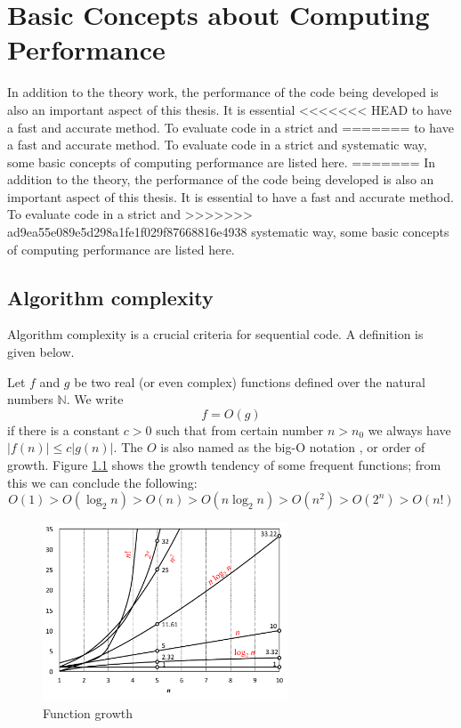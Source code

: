 
\chapter{Basic Concepts about Computing Performance\label{chpt:computing-performance}}

In addition to the theory work, the performance of the code being
developed is also an important aspect of this thesis. It is essential
<<<<<<< HEAD
to have a fast and accurate method. To evaluate code in a strict and
=======
to have a fast and accurate method. To evaluate code in a strict
and systematic way, some basic concepts of computing performance are
listed here. 
=======
In addition to the theory, the performance of the code being developed is
also an important aspect of this thesis. It is essential to
have a fast and accurate method. To evaluate code in a strict and
>>>>>>> ad9ea55e089e5d298a1fe1f029f87668816e4938
systematic way, some basic concepts of computing performance are listed
here. 


\section{Algorithm complexity}

Algorithm complexity is a crucial criteria for sequential code. A
definition is given below.

Let $f$ and $g$ be two real (or even complex) functions defined
over the natural numbers $\mathbb{N}$. We write
\begin{equation}
f=O(g)
\end{equation}
if there is a constant $c>0$ such that from certain number $n>n_{0}$
we always have $\left|f(n)\right|\leq c\left|g(n)\right|.$ The $O$
is also named as the big-O notation \citep{Complexity}, or order
of growth. Figure \ref{fig:order-of-growth} shows the growth tendency
of some frequent functions; from this we can conclude the following:
\begin{equation}
O(1)>O(\log_{2}n)>O(n)>O(n\log_{2}n)>O(n^{2})>O(2^{n})>O(n!)
\end{equation}


\begin{figure}[h]
\begin{centering}
\includegraphics[width=0.65\textwidth]{_figure/orders-of-growth}
\par\end{centering}

\caption{Function growth\label{fig:order-of-growth}}
\end{figure}


